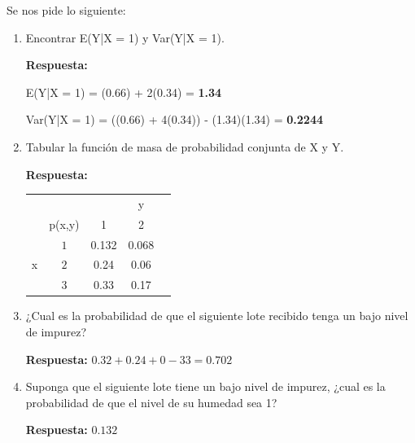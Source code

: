 \documentclass{article}\usepackage[]{graphicx}\usepackage[]{color}
\begin{document}
Se nos pide lo siguiente:
\begin{enumerate}
\item  Encontrar E(Y|X = 1) y Var(Y|X = 1).

\textbf{Respuesta:}

E(Y|X = 1) = (0.66) + 2(0.34) = \textbf{1.34}

Var(Y|X = 1) = ((0.66) + 4(0.34)) - (1.34)(1.34) = \textbf{0.2244}



\item  Tabular la función de masa de probabilidad conjunta de X y Y.


\textbf{Respuesta:}


\begin{tabular}{cc|ccc}
                       &        &                           & y                         &      \\ \cline{3-5} 
                       & p(x,y) & \multicolumn{1}{c|}{1}  & \multicolumn{1}{c|}{2}   \\ \hline
\multicolumn{1}{c|}{}  & $1$
    & \multicolumn{1}{c|}{0.132} & \multicolumn{1}{c|}{0.068} \\ \hline
\multicolumn{1}{c|}{x} & $2$   & \multicolumn{1}{c|}{0.24} & \multicolumn{1}{c|}{0.06}  \\ \hline
\multicolumn{1}{c|}{}  & $3$   & \multicolumn{1}{c|}{0.33} & \multicolumn{1}{c|}{0.17} 
\end{tabular}


\item  ¿Cual es la probabilidad de que el siguiente lote recibido tenga un bajo nivel de impurez?

\textbf{Respuesta:}
$0.32+0.24+0-33 = 0.702$
\item Suponga que el siguiente lote tiene un bajo nivel de impurez, ¿cual es la probabilidad de que el nivel de su humedad sea 1?

\textbf{Respuesta:}
$0.132$
\end{enumerate}
\end{document}
